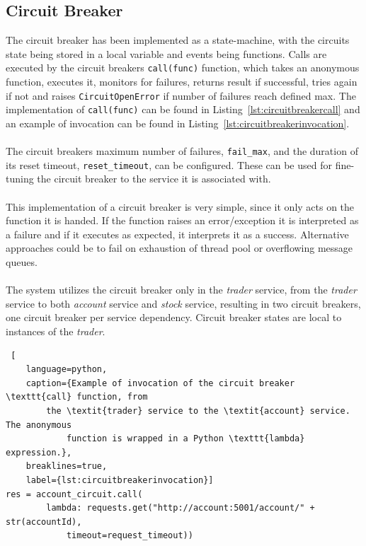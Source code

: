 \subsection{Circuit Breaker}
The circuit breaker has been implemented as a state-machine, with the
circuits state being stored in a local variable and events being functions.
Calls are executed by the circuit breakers \texttt{call(func)} function, which takes
an anonymous function, executes it, monitors for failures, returns result if
successful, tries again if not and raises \texttt{CircuitOpenError} if number of
failures reach defined max. The implementation of \texttt{call(func)} can be found in
Listing~\ref{lst:circuitbreakercall} and an example of invocation can be found
in Listing~\ref{lst:circuitbreakerinvocation}.
\\\\
The circuit breakers maximum number of failures, \texttt{fail\_max}, and the duration
of its reset timeout, \texttt{reset\_timeout}, can be configured. These can be used for
fine-tuning the circuit breaker to the service it is associated with. 
\\\\
This implementation of a circuit breaker is very simple, since it only acts on
the function it is handed. If the function raises an error/exception it is
interpreted as a failure and if it executes as expected, it interprets it as a
success. Alternative approaches could be to fail on exhaustion of thread pool
or overflowing message queues.
\\\\
The system utilizes the circuit breaker only in the \textit{trader} service,
from the \textit{trader} service to both \textit{account} service and 
\textit{stock} service, resulting in two circuit breakers, one circuit breaker
per service dependency. Circuit breaker states are local to instances of the 
\textit{trader}.

\begin{lstlisting} [
	language=python,
	caption={Example of invocation of the circuit breaker \texttt{call} function, from
		the \textit{trader} service to the \textit{account} service. The anonymous
			function is wrapped in a Python \texttt{lambda} expression.},
	breaklines=true,
	label={lst:circuitbreakerinvocation}]
res = account_circuit.call(
		lambda: requests.get("http://account:5001/account/" + str(accountId),
			timeout=request_timeout))
\end{lstlisting}

